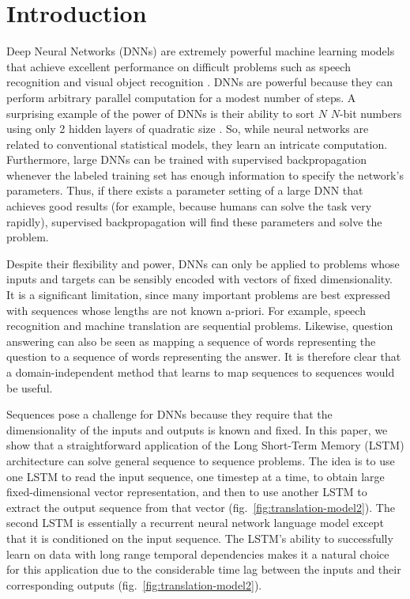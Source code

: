 \section{Introduction}

Deep Neural Networks (DNNs) are extremely powerful machine learning
models that achieve excellent performance on difficult problems such
as speech recognition \cite{hinton12,dahl12b} and visual object
recognition \cite{kriz12,ciresan12,lecun98,le12}.  DNNs are
powerful because they can perform arbitrary parallel computation for a
modest number of steps.  A surprising example of the power of DNNs is
their ability to sort $N$ \!\!\!\!\quad $N$-bit numbers using only 2
hidden layers of quadratic size \cite{razborov}. So, while neural
networks are related to conventional statistical models, they learn an
intricate computation.  Furthermore, large DNNs can be trained with
supervised backpropagation whenever the labeled training set has
enough information to specify the network's parameters.  Thus, if
there exists a parameter setting of a large DNN that achieves good
results (for example, because humans can solve the task very rapidly),
supervised backpropagation will find these parameters and solve the
problem.

Despite their flexibility and power, DNNs can only be applied to
problems whose inputs and targets can be sensibly encoded with vectors
of fixed dimensionality.  It is a significant limitation, since many
important problems are best expressed with sequences whose lengths are
not known a-priori.  For example, speech recognition and machine
translation are sequential problems.  Likewise, question answering can
also be seen as mapping a sequence of words representing the question
to a sequence of words representing the answer.  It is therefore clear
that a domain-independent method that learns to map sequences to
sequences would be useful.

Sequences pose a challenge for DNNs because they require that the
dimensionality of the inputs and outputs is known and fixed.  
In this paper, we show that a straightforward application of the Long
Short-Term Memory (LSTM) architecture \cite{hochreiter97} can solve
general sequence to sequence problems.  The idea is to use one LSTM to
read the input sequence, one timestep at a time, to obtain large
fixed-dimensional vector representation, and then to use another LSTM
to extract the output sequence from that vector
(fig.~\ref{fig:translation-model2}).  The second LSTM is essentially a
recurrent neural network language model
\cite{rumelhart1986learning,mikolov2010recurrent,sundermeyer12} except
that it is conditioned on the input sequence.  The LSTM's ability to
successfully learn on data with long range temporal dependencies makes
it a natural choice for this application due to the considerable time
lag between the inputs and their corresponding outputs
(fig.~\ref{fig:translation-model2}).

